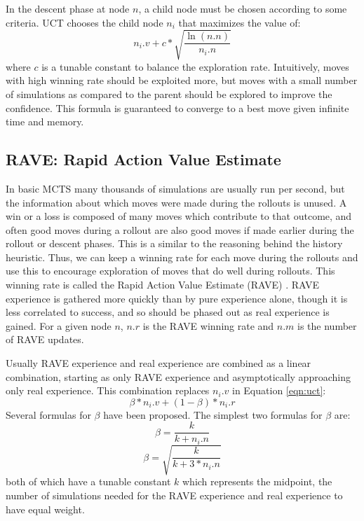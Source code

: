 In the descent phase at node $n$, a child node must be chosen according to some criteria. UCT chooses the child node $n_i$ that maximizes the value of:
\begin{equation}\label{eqn:uct} n_i.v + c*\sqrt{\frac{\ln(n.n)}{n_i.n}}\end{equation}
where $c$ is a tunable constant to balance the exploration rate. Intuitively, moves with high winning rate should be exploited more, but moves with a small number of simulations as compared to the parent should be explored to improve the confidence. This formula is guaranteed to converge to a best move given infinite time and memory.



\subsection{RAVE: Rapid Action Value Estimate}\label{sec:rave}

In basic MCTS many thousands of simulations are usually run per second, but the information about which moves were made during the rollouts is unused. A win or a loss is composed of many moves which contribute to that outcome, and often good moves during a rollout are also good moves if made earlier during the rollout or descent phases. This is a similar to the reasoning behind the history heuristic. Thus, we can keep a winning rate for each move during the rollouts and use this to encourage exploration of moves that do well during rollouts. This winning rate is called the Rapid Action Value Estimate (RAVE) \cite{gelly2007rave}. RAVE experience is gathered more quickly than by pure experience alone, though it is less correlated to success, and so should be phased out as real experience is gained. For a given node $n$,  $n.r$ is the RAVE winning rate and $n.m$ is the number of RAVE updates.

Usually RAVE experience and real experience are combined as a linear combination, starting as only RAVE experience and asymptotically approaching only real experience. This combination replaces $n_i.v$ in Equation \ref{eqn:uct}:
\begin{equation}\label{eqn:rave1} \beta*n_i.v + (1-\beta)*n_i.r \end{equation}
Several formulas for $\beta$ have been proposed. The simplest two formulas for $\beta$ are:
\begin{equation}\label{eqn:rave2} \beta = \frac{k}{k+n_i.n} \end{equation}
\begin{equation}\label{eqn:rave3} \beta = \sqrt{\frac{k}{k+3*n_i.n}} \end{equation}
 both of which have a tunable constant $k$ which represents the midpoint, the number of simulations needed for the RAVE experience and real experience to have equal weight.

